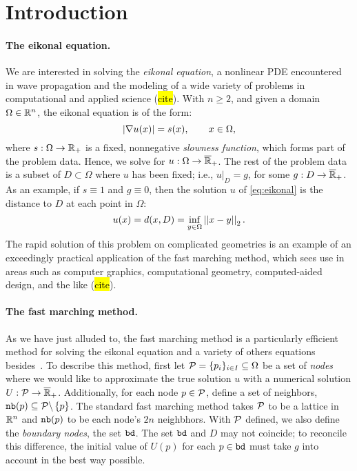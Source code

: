 \documentclass[eikonal.tex]{subfiles}
\begin{document}
\section{Introduction}\label{sec:intro}

\paragraph{The eikonal equation.} We are interested in solving the
\emph{eikonal equation}, a nonlinear PDE encountered in wave
propagation and the modeling of a wide variety of problems in
computational and applied science (\hl{cite}). With $n \geq 2$, and
given a domain $\Omega \in \mathbb{R}^n$, the eikonal equation is of the form:
\begin{equation}\label{eq:eikonal}
  \abs{\nabla u(x)} = s(x), \qquad x \in \Omega,
\end{equation}
where $s : \Omega \to \mathbb{R}_+$ is a fixed, nonnegative \emph{slowness
  function}, which forms part of the problem data. Hence, we solve for
$u : \Omega \to \overline{\mathbb{R}}_+$. The rest of the problem data is a
subset of $D \subset \Omega$ where $u$ has been fixed; i.e.,
$\left. u \right|_D = g$, for some $g : D \to \overline{\mathbb{R}}_+$. As an
example, if $s \equiv 1$ and $g \equiv 0$, then the solution $u$ of
\cref{eq:eikonal} is the distance to $D$ at each point in $\Omega$:
\begin{equation}
  \label{eq:distance-to-Omega}
  u(x) = d(x, D) = \inf_{y \in \Omega} \norm{x - y}_2.
\end{equation}
The rapid solution of this problem on complicated geometries is an
example of an exceedingly practical application of the fast marching
method, which sees use in areas such as computer graphics,
computational geometry, computed-aided design, and the like
(\hl{cite}).

\paragraph{The fast marching method.} As we have just alluded to, the
fast marching method is a particularly efficient method for solving
the eikonal equation and a variety of others equations
besides~\cite{sethian1999level}. To describe this method, first let
$\mathcal{P} = \{p_i\}_{i \in I} \subseteq \Omega$ be a set of
\emph{nodes} where we would like to approximate the true solution $u$
with a numerical solution $U : \mathcal{P} \to
\overline{\mathbb{R}}_+$. Additionally, for each node $p \in \mathcal{P}$, define a
set of neighbors, $\texttt{nb}(p) \subseteq \mathcal{P} \backslash \left\{p\right\}$. The
standard fast marching method takes $\mathcal{P}$ to be a lattice in $\mathbb{R}^n$
and $\texttt{nb}(p)$ to be each node's $2n$ neighbhors. With $\mathcal{P}$
defined, we also define the \emph{boundary nodes}, the set
$\texttt{bd}$. The set $\texttt{bd}$ and $D$ may not coincide; to
reconcile this difference, the initial value of $U(p)$ for each
$p \in \texttt{bd}$ must take $g$ into account in the best way possible.
\end{document}
